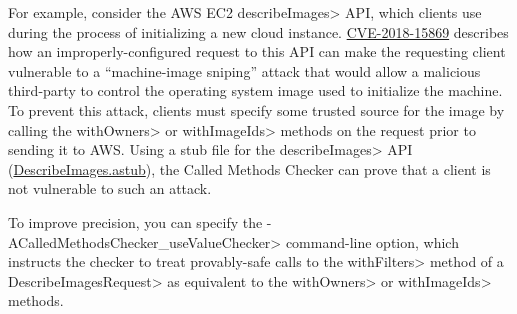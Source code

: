 For example, consider the AWS EC2 \<describeImages> API, which
clients use during the process of initializing a new cloud instance.
\href{https://cve.mitre.org/cgi-bin/cvename.cgi?name=CVE-2018-15869}{CVE-2018-15869}
describes how an improperly-configured request to this API can make the
requesting client vulnerable to a ``machine-image sniping'' attack that
would allow a malicious third-party to control the operating system image
used to initialize the machine. To prevent this attack, clients must
specify some trusted source for the image by calling the \<withOwners> or
\<withImageIds> methods on the request prior to sending it to AWS\@. Using
a stub file for the \<describeImages> API
(\href{https://github.com/typetools/checker-framework/blob/master/checker/src/main/java/org/checkerframework/checker/calledmethods/DescribeImages.astub}{DescribeImages.astub}),
the Called Methods Checker can prove that a client is not vulnerable to
such an attack.

To improve precision, you can specify the
\<-ACalledMethodsChecker\_useValueChecker> command-line option, which
instructs the checker to treat provably-safe calls to the \<withFilters>
method of a \<DescribeImagesRequest> as equivalent to the \<withOwners> or
\<withImageIds> methods.

